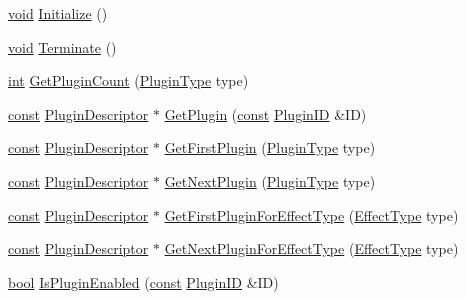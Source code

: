 \begin{DoxyCompactItemize}
\hyperlink{sound_8c_ae35f5844602719cf66324f4de2a658b3}{void} \hyperlink{class_plugin_manager_a7b8344ee6e6081589b2599a4cdddc077}{Initialize} ()
\item 
\hyperlink{sound_8c_ae35f5844602719cf66324f4de2a658b3}{void} \hyperlink{class_plugin_manager_a5555cc50f0081ed9a19788baee1c8c71}{Terminate} ()
\item 
\hyperlink{xmltok_8h_a5a0d4a5641ce434f1d23533f2b2e6653}{int} \hyperlink{class_plugin_manager_ac8e9a6f63fd666ab402bc5b6f8ef579f}{Get\+Plugin\+Count} (\hyperlink{_plugin_manager_8h_a54e0db21fd49ff6e0178b6ebe120a6d2}{Plugin\+Type} type)
\item 
\hyperlink{getopt1_8c_a2c212835823e3c54a8ab6d95c652660e}{const} \hyperlink{class_plugin_descriptor}{Plugin\+Descriptor} $\ast$ \hyperlink{class_plugin_manager_a84b8a0e8d9af185d849d8fd9fba2d69c}{Get\+Plugin} (\hyperlink{getopt1_8c_a2c212835823e3c54a8ab6d95c652660e}{const} \hyperlink{include_2audacity_2_types_8h_abe9b737fcebc2b5bea606246e1eab52e}{Plugin\+ID} \&ID)
\item 
\hyperlink{getopt1_8c_a2c212835823e3c54a8ab6d95c652660e}{const} \hyperlink{class_plugin_descriptor}{Plugin\+Descriptor} $\ast$ \hyperlink{class_plugin_manager_ac48483b481a43631934346c77ca104fb}{Get\+First\+Plugin} (\hyperlink{_plugin_manager_8h_a54e0db21fd49ff6e0178b6ebe120a6d2}{Plugin\+Type} type)
\item 
\hyperlink{getopt1_8c_a2c212835823e3c54a8ab6d95c652660e}{const} \hyperlink{class_plugin_descriptor}{Plugin\+Descriptor} $\ast$ \hyperlink{class_plugin_manager_ac12e525c010e5d218ede9e2d4035e65b}{Get\+Next\+Plugin} (\hyperlink{_plugin_manager_8h_a54e0db21fd49ff6e0178b6ebe120a6d2}{Plugin\+Type} type)
\item 
\hyperlink{getopt1_8c_a2c212835823e3c54a8ab6d95c652660e}{const} \hyperlink{class_plugin_descriptor}{Plugin\+Descriptor} $\ast$ \hyperlink{class_plugin_manager_a37c21d6cf280a8f8db247be722ae6bbe}{Get\+First\+Plugin\+For\+Effect\+Type} (\hyperlink{_effect_interface_8h_a4809a7bb3fd1a421902a667cc1405d43}{Effect\+Type} type)
\item 
\hyperlink{getopt1_8c_a2c212835823e3c54a8ab6d95c652660e}{const} \hyperlink{class_plugin_descriptor}{Plugin\+Descriptor} $\ast$ \hyperlink{class_plugin_manager_a36214edd7893fd6599a4c5d16ca1e9d6}{Get\+Next\+Plugin\+For\+Effect\+Type} (\hyperlink{_effect_interface_8h_a4809a7bb3fd1a421902a667cc1405d43}{Effect\+Type} type)
\item 
\hyperlink{mac_2config_2i386_2lib-src_2libsoxr_2soxr-config_8h_abb452686968e48b67397da5f97445f5b}{bool} \hyperlink{class_plugin_manager_a0ad26bc326893a89a91c1f6e3fdbe3fc}{Is\+Plugin\+Enabled} (\hyperlink{getopt1_8c_a2c212835823e3c54a8ab6d95c652660e}{const} \hyperlink{include_2audacity_2_types_8h_abe9b737fcebc2b5bea606246e1eab52e}{Plugin\+ID} \&ID)

\end{DoxyCompactItemize}
